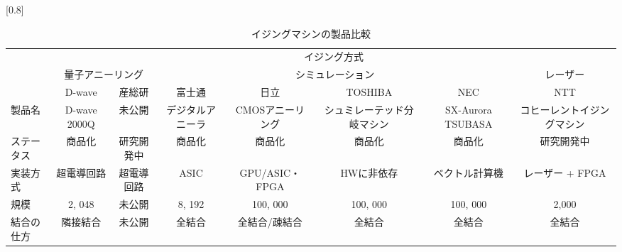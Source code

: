 \begin{landscape}
	\begin{table}[hbtp]
		\caption{イジングマシンの製品比較}
		\label{tb:laser_machine}
		\scalebox{0.7}[0.8]{
			\centering
			\begin{tabular}{lccccccc}
				\hline
				&\multicolumn{7}{c}{イジング方式} \\
				&\multicolumn{2}{c}{量子アニーリング} &\multicolumn{4}{c}{シミュレーション} & レーザー\\
				& D-wave & 産総研 & 富士通 & 日立 & TOSHIBA & NEC & NTT \\
				\hline\hline
				製品名 & D-wave 2000Q & 未公開 & デジタルアニーラ & CMOSアニーリング & シュミレーテッド分岐マシン & SX-Aurora TSUBASA & コヒーレントイジングマシン\\
				ステータス & 商品化 & 研究開発中 & 商品化 & 商品化 & 商品化 & 商品化 & 研究開発中\\
				実装方式 & 超電導回路 & 超電導回路 & ASIC & GPU/ASIC・FPGA & HWに非依存 & ベクトル計算機 & レーザー + FPGA\\
				規模 & 2, 048 & 未公開 & 8, 192 & 100, 000 & 100, 000 & 100, 000 & 2,000\\
				結合の仕方 & 隣接結合 & 未公開 & 全結合 & 全結合/疎結合 & 全結合 & 全結合 & 全結合\\
				\hline
			\end{tabular}
		}
	\end{table}
\end{landscape}


